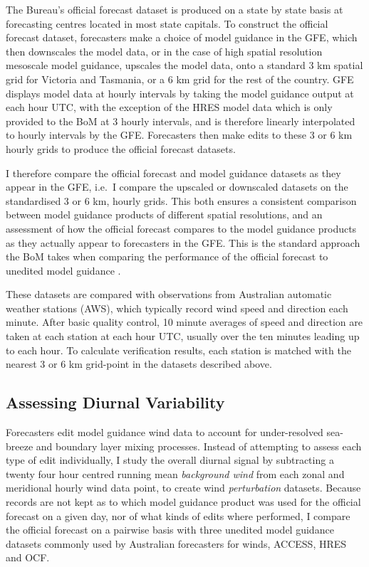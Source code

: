 \documentclass{ametsoc}
\begin{document}
The Bureau's official forecast dataset is produced on a state by state basis at forecasting centres located in most state capitals. To construct the official forecast dataset, forecasters make a choice of model guidance in the GFE, which then downscales the model data, or in the case of high spatial resolution mesoscale model guidance, upscales the model data, onto a standard 3 km spatial grid for Victoria and Tasmania, or a 6 km grid for the rest of the country. GFE displays model data at hourly intervals by taking the model guidance output at each hour UTC, with the exception of the HRES model data which is only provided to the BoM at 3 hourly intervals, and is therefore linearly interpolated to hourly intervals by the GFE. Forecasters then make edits to these 3 or 6 km hourly grids to produce the official forecast datasets.

I therefore compare the official forecast and model guidance datasets as they appear in the GFE, i.e.~I compare the upscaled or downscaled datasets on the standardised 3 or 6 km, hourly grids. This both ensures a consistent comparison between model guidance products of different spatial resolutions, and an assessment of how the official forecast compares to the model guidance products as they actually appear to forecasters in the GFE. This is the standard approach the BoM takes when comparing the performance of the official forecast to unedited model guidance \citep[e.g.][]{griffiths17}.

These datasets are compared with observations from Australian automatic weather stations (AWS), which typically record wind speed and direction each minute. After basic quality control, 10 minute averages of speed and direction are taken at each station at each hour UTC, usually over the ten minutes leading up to each hour. To calculate verification results, each station is matched with the nearest 3 or 6 km grid-point in the datasets described above.

\subsection{Assessing Diurnal Variability}
Forecasters edit model guidance wind data to account for under-resolved sea-breeze and boundary layer mixing processes. Instead of attempting to assess each type of edit individually, I study the overall diurnal signal by subtracting a twenty four hour centred running mean \textit{background wind} from each zonal and meridional hourly wind data point, to create wind \emph{perturbation} datasets. Because records are not kept as to which model guidance product was used for the official forecast on a given day, nor of what kinds of edits where performed, I compare the official forecast on a pairwise basis with three unedited model guidance datasets commonly used by Australian forecasters for winds, ACCESS, HRES and OCF.
\end{document}
